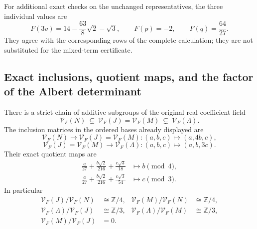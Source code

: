For additional exact checks on the unchanged representatives, the
three individual values are
\[
 F(3v)=14-\frac{63}{8}\sqrt2-\sqrt3,\qquad
 F(p)=-2,\qquad F(q)=\frac{64}{27}.
\]
They agree with the corresponding rows of the complete calculation;
they are not substituted for the mixed-term certificate.

\subsection{Exact inclusions, quotient maps, and the factor of the Albert determinant}

\begin{theorem}
\label{jmv:thm:chain}
There is a strict chain of additive subgroups of the original real
coefficient field
\[
 \mathcal V_F(N)\ \subsetneq\ \mathcal V_F(J)=\mathcal V_F(M)
                       \ \subsetneq\ \mathcal V_F(\Lambda).
\]
The inclusion matrices in the ordered bases already displayed are
\[
 \mathcal V_F(N)\longrightarrow\mathcal V_F(J)=\mathcal V_F(M):
       (a,b,c)\longmapsto(a,4b,c),
\]
\[
 \mathcal V_F(J)=\mathcal V_F(M)\longrightarrow\mathcal V_F(\Lambda):
       (a,b,c)\longmapsto(a,b,3c).
\]
Their exact quotient maps are
\begin{align*}
 \frac a{27}+\frac{b\sqrt2}{216}+\frac{c\sqrt3}{18}
       &\longmapsto b\pmod4,\\
 \frac a{27}+\frac{b\sqrt2}{216}+\frac{c\sqrt3}{54}
       &\longmapsto c\pmod3.
\end{align*}
In particular
\begin{align*}
 \mathcal V_F(J)/\mathcal V_F(N)&\cong\mathbb Z/4,&
 \mathcal V_F(M)/\mathcal V_F(N)&\cong\mathbb Z/4,\\
 \mathcal V_F(\Lambda)/\mathcal V_F(J)&\cong\mathbb Z/3,&
 \mathcal V_F(\Lambda)/\mathcal V_F(M)&\cong\mathbb Z/3,\\
 \mathcal V_F(M)/\mathcal V_F(J)&=0.&&
\end{align*}
\end{theorem}
